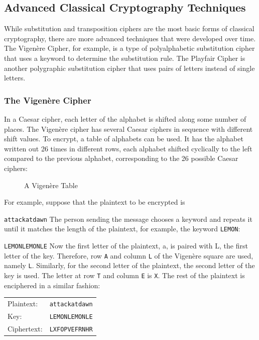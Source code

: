 \documentclass[11pt,a4paper]{report}
\begin{document}
\subsection{Advanced Classical Cryptography Techniques}

While substitution and transposition ciphers are the most basic forms of classical cryptography, there are more advanced techniques that were developed over time.
The Vigenère Cipher, for example, is a type of polyalphabetic substitution cipher that uses a keyword to determine the substitution rule.
The Playfair Cipher is another polygraphic substitution cipher that uses pairs of letters instead of single letters.
\subsubsection{The Vigenère Cipher}

In a Caesar cipher, each letter of the alphabet is shifted along some number of places.
The Vigenère cipher has several Caesar ciphers in sequence with different shift values.
To encrypt, a table of alphabets can be used. It has the alphabet written out 26 times in different rows, each alphabet shifted cyclically to the left compared to the previous alphabet, corresponding to the 26 possible Caesar ciphers:
\begin{figure}[h]
\caption{A Vigenère Table}
\end{figure}

For example, suppose that the plaintext to be encrypted is

\verb|attackatdawn|
The person sending the message chooses a keyword and repeats it until it matches the length of the plaintext, for example, the keyword \verb|LEMON|:


\verb|LEMONLEMONLE|
Now the first letter of the plaintext, a, is paired with L, the first letter of the key.
Therefore, row \verb|A| and column \verb|L| of the Vigenère square are used, namely \verb|L|.
Similarly, for the second letter of the plaintext, the second letter of the key is used.
The letter at row \verb|T| and column \verb|E| is \verb|X|.
The rest of the plaintext is enciphered in a similar fashion:
\begin{center}
\begin{tabular}{ll}
Plaintext: & 	\verb|attackatdawn| \\
Key: & 	\verb|LEMONLEMONLE| \\
Ciphertext:	 & \verb|LXFOPVEFRNHR|
\end{tabular}
\end{center}
\end{document}
